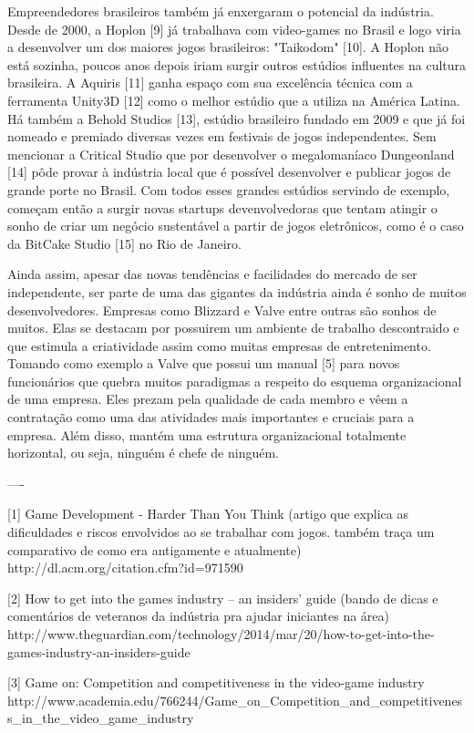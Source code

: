 Empreendedores brasileiros também já enxergaram o potencial da indústria. Desde de 2000, a Hoplon [9] já trabalhava com video-games no Brasil e logo viria a desenvolver um dos maiores jogos brasileiros: "Taikodom" [10]. A Hoplon não está sozinha, poucos anos depois iriam surgir outros estúdios influentes na cultura brasileira. A Aquiris [11] ganha espaço com sua excelência técnica com a ferramenta Unity3D [12] como o melhor estúdio que a utiliza na América Latina. Há também a Behold Studios [13], estúdio brasileiro fundado em 2009 e que já foi nomeado e premiado diversas vezes em festivais de jogos independentes. Sem mencionar a Critical Studio que por desenvolver o megalomaníaco Dungeonland [14] pôde provar à indústria local que é possível desenvolver e publicar jogos de grande porte no Brasil. Com todos esses grandes estúdios servindo de exemplo, começam então a surgir novas startups devenvolvedoras que tentam atingir o sonho de criar um negócio sustentável a partir de jogos eletrônicos, como é o caso da BitCake Studio [15] no Rio de Janeiro.

Ainda assim, apesar das novas tendências e facilidades do mercado de ser independente, ser parte de uma das gigantes da indústria ainda é sonho de muitos desenvolvedores. Empresas como Blizzard e Valve entre outras são sonhos de muitos. Elas se destacam por possuirem um ambiente de trabalho descontraido e que estimula a criatividade assim como muitas empresas de entretenimento. Tomando como exemplo a Valve que possui um manual [5] para novos funcionários que quebra muitos paradigmas a respeito do esquema organizacional de uma empresa. Eles prezam pela qualidade de cada membro e vêem a contratação como uma das atividades mais importantes e cruciais para a empresa. Além disso, mantém uma estrutura organizacional totalmente horizontal, ou seja, ninguém é chefe de ninguém.

----

[1] Game Development - Harder Than You Think
(artigo que explica as dificuldades e riscos envolvidos ao se trabalhar com jogos. também traça um comparativo de como era antigamente e atualmente)
http://dl.acm.org/citation.cfm?id=971590

[2] How to get into the games industry – an insiders' guide
(bando de dicas e comentários de veteranos da indústria pra ajudar iniciantes na área)
http://www.theguardian.com/technology/2014/mar/20/how-to-get-into-the-games-industry-an-insiders-guide

[3] Game on: Competition and competitiveness in the video-game industry
http://www.academia.edu/766244/Game_on_Competition_and_competitiveness_in_the_video_game_industry

